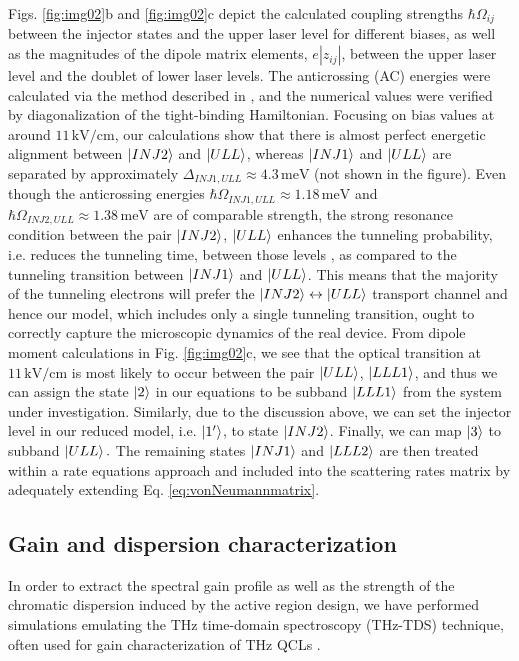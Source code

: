 \documentclass[10pt,letterpaper]{article}%
\begin{document}
Figs. \ref{fig:img02}b and \ref{fig:img02}c depict the calculated coupling
strengths $\hbar\Omega_{ij}$ between the injector states and the upper laser
level for different biases, as well as the magnitudes of the dipole matrix
elements, $e\left|  z_{ij}\right|  $, between the upper laser level and the
doublet of lower laser levels. The anticrossing (AC) energies were calculated via
the method described in \cite{bastardwave}, and the numerical values were
verified by diagonalization of the tight-binding Hamiltonian. Focusing on bias
values at around $11{\,}\mathrm{kV}/\mathrm{cm}$, our calculations show that
there is almost perfect energetic alignment between $\Ket{INJ2}\ $and
$\Ket{ULL}$, whereas $\Ket{INJ1}$ and $\Ket{ULL}$ are separated by
approximately $\Delta_{INJ1,ULL}\approx4.3{\,}\mathrm{meV}$ (not shown in the
figure). Even though the anticrossing energies $\hbar\Omega_{INJ1,ULL}%
\approx1.18{\,}\mathrm{meV}$ and $\hbar\Omega_{INJ2,ULL}\approx1.38{\,}%
\mathrm{meV}$ are of comparable strength, the strong resonance condition
between the pair $\Ket{INJ2}$, $\Ket{ULL}$ enhances the tunneling probability,
i.e. reduces the tunneling time, between those levels
\cite{williams2007terahertz}, as compared to the tunneling transition between
$\Ket{INJ1}$ and $\Ket{ULL}$. This means that the majority of the tunneling
electrons will prefer the $\Ket{INJ2}\leftrightarrow\Ket{ULL}$ transport
channel and hence our model, which includes only a single tunneling
transition, ought to correctly capture the microscopic dynamics of the real
device. From dipole moment calculations in Fig. \ref{fig:img02}c, we see that
the optical transition at $11{\,}\mathrm{kV}/\mathrm{cm}$ is most likely to
occur between the pair $\Ket{ULL}$, $\Ket{LLL1}$, and thus we can assign the
state $\Ket{2}$ in our equations to be subband $\Ket{LLL1}$ from the system
under investigation. Similarly, due to the discussion above, we can set the
injector level in our reduced model, i.e. $\Ket{1'}$, to state $\Ket{INJ2}$.
Finally, we can map $\Ket{3}$ to subband $\Ket{ULL}.$ The remaining states
$\Ket{INJ1}$ and $\Ket{LLL2}$ are then treated within a rate equations
approach and included into the scattering rates matrix by adequately extending
Eq. \ref{eq:vonNeumannmatrix}.

\subsection{Gain and dispersion characterization}

\label{subsec:numthztds} In order to extract the spectral gain profile as well
as the strength of the chromatic dispersion induced by the active region
design, we have performed simulations emulating the THz time-domain
spectroscopy (THz-TDS) technique, often used for gain characterization of THz
QCLs \cite{burghoff2014broadband,jukam2008gain}.
\end{document}

